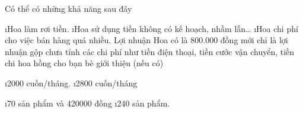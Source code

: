 \begin{Answer}{55}
		Có thể có những khả năng sau đây
		\begin{enumerate}[--,leftmargin=*]
			\i Hoa làm rơi tiền.
			\i Hoa sử dụng tiền không có kế hoạch, nhầm lẫn…
			\i Hoa chi phí cho việc bán hàng quá nhiều. Lợi nhuận Hoa có là 800.000 đồng mới chỉ là lợi nhuận gộp chưa tính các chi phí như tiền điện thoại, tiền cước vận chuyển, tiền chi hoa hồng cho bạn bè giới thiệu (nếu có)
		\end{enumerate}
	
\end{Answer}
\begin{Answer}{56}
		\begin{enumerate}[a),leftmargin=*]
			\i 2000 cuốn/tháng.
			\i 2800 cuốn/tháng
		\end{enumerate}
	
\end{Answer}
\begin{Answer}{57}
		\begin{enumerate}[a),leftmargin=*]
			\i 70 sản phẩm và 420000 đồng
			\i 240 sản phẩm.
		\end{enumerate}
	
\end{Answer}
